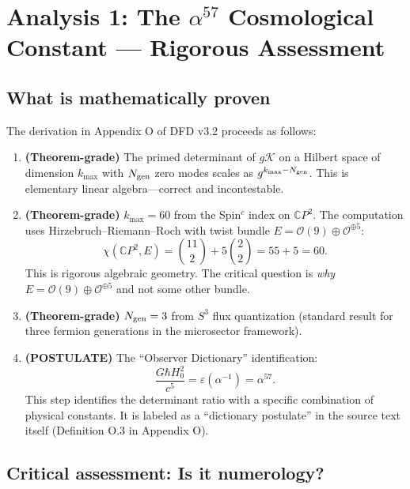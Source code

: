 \documentclass[11pt]{article}
\begin{document}
\section{Analysis 1: The $\alpha^{57}$ Cosmological Constant --- Rigorous Assessment}
\label{sec:alpha57}

\subsection{What is mathematically proven}

The derivation in Appendix O of DFD v3.2 proceeds as follows:

\begin{enumerate}[label=\textbf{Step \arabic*:}]
\item \textbf{(Theorem-grade)} The primed determinant of $g\mathcal{K}$ on a Hilbert space of dimension $k_{\max}$ with $N_{\rm gen}$ zero modes scales as $g^{k_{\max}-N_{\rm gen}}$. This is elementary linear algebra---correct and incontestable.

\item \textbf{(Theorem-grade)} $k_{\max} = 60$ from the Spin$^c$ index on $\mathbb{C}P^2$. The computation uses Hirzebruch--Riemann--Roch with twist bundle $E = \mathcal{O}(9) \oplus \mathcal{O}^{\oplus 5}$:
\[
\chi(\mathbb{C}P^2, E) = \binom{11}{2} + 5\binom{2}{2} = 55 + 5 = 60.
\]
This is rigorous algebraic geometry. The critical question is \emph{why} $E = \mathcal{O}(9) \oplus \mathcal{O}^{\oplus 5}$ and not some other bundle.

\item \textbf{(Theorem-grade)} $N_{\rm gen} = 3$ from $S^3$ flux quantization (standard result for three fermion generations in the microsector framework).

\item \textbf{(POSTULATE)} The ``Observer Dictionary'' identification:
\[
\frac{G\hbar H_0^2}{c^5} = \varepsilon(\alpha^{-1}) = \alpha^{57}.
\]
This step identifies the determinant ratio with a specific combination of physical constants. It is labeled as a ``dictionary postulate'' in the source text itself (Definition O.3 in Appendix O).
\end{enumerate}

\subsection{Critical assessment: Is it numerology?}
\end{document}
